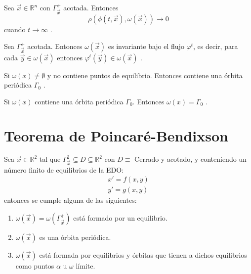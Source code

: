 \begin{lemma}
	Sea $\vec{x}\in\mathbb{R}^n$ con $\Gamma_{\vec{x}}^+$ acotada.
	Entonces
	$$\rho(\phi(t,\vec{x}),\omega(\vec{x}))\to0$$
	cuando $t \to \infty$ \cite{hirsch2012differential}.
\end{lemma}

\begin{lemma}[Invarianza]
	Sea $\Gamma_{\vec{x}}^+$ acotada. Entonces $\omega(\vec{x})$
	es invariante bajo el flujo
	$\varphi^t$, es decir, para cada $\vec{y}\in\omega(\vec{x})$ entonces
	$\varphi ^t(\vec{y})\in\omega(\vec{x})$ \cite{arnold1992ordinary}.
\end{lemma}

\begin{lemma}
	Si $\omega(x)\neq\emptyset$ y no contiene puntos de equilibrio. Entonces contiene una órbita periódica $\varGamma_0$ \cite{strogatz2018nonlinear}.
\end{lemma}

\begin{lemma}
	Si $\omega(x)$ contiene una órbita periódica $\varGamma_0$. Entonces $\omega(x)=\varGamma_0$ \cite{guckenheimer1983nonlinear}.
\end{lemma}

\section{Teorema de Poincaré-Bendixson}

\begin{theorem}\label{TPB}
	Sea $\vec{x}\in\mathbb{R}^2$ tal que $\varGamma_{\vec{x}}^2\subseteq D\subseteq\mathbb{R}^2$ con $D\equiv$ Cerrado y acotado,
	y conteniendo un número finito de equilibrios de la EDO:
	\begin{equation}
		\begin{matrix}
			x' = f(x,y) \\
			y' = g(x,y)
		\end{matrix}
	\end{equation}
	entonces se cumple alguna de las siguientes:
	\begin{enumerate}
		\item $\omega(\vec{x})=\omega(\varGamma_{\vec{x}}^+)$ está formado por un equilibrio.
		\item $\omega(\vec{x})$ es una órbita periódica.
		\item $\omega(\vec{x})$ está formada por equilibrios y órbitas que tienen a dichos equilibrios como puntos
		      $\alpha$ u $\omega$ límite.
	\end{enumerate}
\end{theorem}

